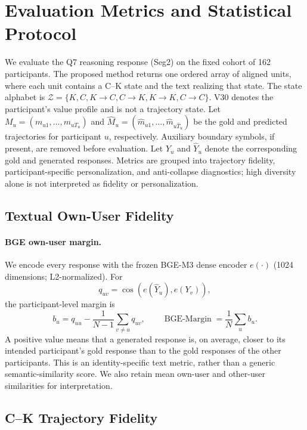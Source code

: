 \section{Evaluation Metrics and Statistical Protocol}
\label{app:evaluation_metrics}

We evaluate the Q7 reasoning response (Seg2) on the fixed cohort of 162
participants. The proposed method returns one ordered array of aligned units,
where each unit contains a C--K state and the text realizing that state. The
state alphabet is
\(\mathcal Z=\{K,C,K{\to}C,C{\to}K,K{\to}K,C{\to}C\}\).
V30 denotes the participant's value profile and is not a trajectory state.
Let \(M_u=(m_{u1},\ldots,m_{uT_u})\) and
\(\widehat M_u=(\widehat m_{u1},\ldots,\widehat m_{u\widehat T_u})\)
be the gold and predicted trajectories for participant \(u\), respectively.
Auxiliary boundary symbols, if present, are removed before evaluation. Let
\(Y_u\) and \(\widehat Y_u\) denote the corresponding gold and generated
responses. Metrics are grouped into trajectory fidelity, participant-specific
personalization, and anti-collapse diagnostics; high diversity alone is not
interpreted as fidelity or personalization.

\subsection{Textual Own-User Fidelity}

\paragraph{BGE own-user margin.}
We encode every response with the frozen BGE-M3 dense encoder \(e(\cdot)\)
(1024 dimensions; L2-normalized). For
\[
q_{uv}=\cos\!\left(e(\widehat Y_u),e(Y_v)\right),
\]
the participant-level margin is
\begin{equation}
b_u=q_{uu}-\frac{1}{N-1}\sum_{v\ne u}q_{uv},
\qquad
\operatorname{BGE\text{-}Margin}=\frac{1}{N}\sum_u b_u .
\label{eq:bge_own_user_margin}
\end{equation}
A positive value means that a generated response is, on average, closer to
its intended participant's gold response than to the gold responses of the
other participants. This is an identity-specific text metric, rather than a
generic semantic-similarity score. We also retain mean own-user and
other-user similarities for interpretation.

\subsection{C--K Trajectory Fidelity}

